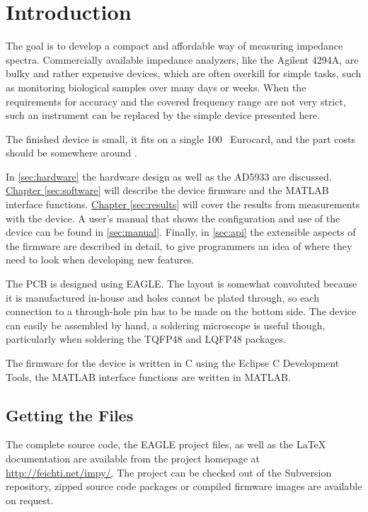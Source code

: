 \chapter{Introduction}

The goal is to develop a compact and affordable way of measuring impedance spectra. Commercially available impedance
analyzers, like the Agilent 4294A, are bulky and rather expensive devices, which are often overkill for simple
tasks, such as monitoring biological samples over many days or weeks. When the requirements for accuracy and the covered
frequency range are not very strict, such an instrument can be replaced by the simple device presented here.

The finished device is small, it fits on a single \unit{100 }{\milli\meter} Eurocard, and the part costs
should be somewhere around .

In \autoref{sec:hardware} the hardware design as well as the AD5933 are discussed.
\hyperref[sec:software]{Chapter \ref*{sec:software}} will describe the device firmware and the MATLAB interface
functions.
\hyperref[sec:results]{Chapter \ref*{sec:results}} will cover the results from measurements with the device.
A user's manual that shows the configuration and use of the device can be found in \autoref{sec:manual}.
Finally, in \autoref{sec:api} the extensible aspects of the firmware are described in detail, to give programmers an
idea of where they need to look when developing new features.

The PCB is designed using EAGLE\footnotemark{}. The layout is somewhat convoluted because it is manufactured in-house
and holes cannot be plated through, so each connection to a through-hole pin has to be made on the bottom side.
The device can easily be assembled by hand, a soldering microscope is useful though, particularly when soldering the
TQFP48 and LQFP48 packages.


The firmware for the device is written in C using the Eclipse C Development Tools\footnotemark{}, the MATLAB interface
functions are written in MATLAB.



\section{Getting the Files}

The complete source code, the EAGLE project files, as well as the \LaTeX{} documentation are available from the project
homepage at \url{http://feichti.net/impy/}. The project can be checked out of the Subversion repository, zipped source
code packages or compiled firmware images are available on request.
